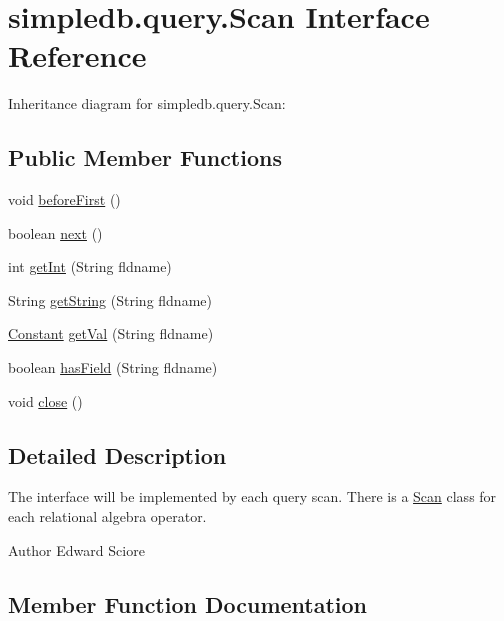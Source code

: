 \hypertarget{interfacesimpledb_1_1query_1_1Scan}{}\section{simpledb.\+query.\+Scan Interface Reference}
\label{interfacesimpledb_1_1query_1_1Scan}


Inheritance diagram for simpledb.\+query.\+Scan\+:
\subsection*{Public Member Functions}
\begin{DoxyCompactItemize}
\item 
void \hyperlink{interfacesimpledb_1_1query_1_1Scan_a2eceb634b69da9bf1269a4355808cc6b}{before\+First} ()
\item 
boolean \hyperlink{interfacesimpledb_1_1query_1_1Scan_a5fc77b7c76d91f89f6c09ac4f15ef351}{next} ()
\item 
int \hyperlink{interfacesimpledb_1_1query_1_1Scan_a2e064555e16240115167b5d42d2b3d19}{get\+Int} (String fldname)
\item 
String \hyperlink{interfacesimpledb_1_1query_1_1Scan_a922e219fee53ecfa6163525f9e3ef222}{get\+String} (String fldname)
\item 
\hyperlink{classsimpledb_1_1query_1_1Constant}{Constant} \hyperlink{interfacesimpledb_1_1query_1_1Scan_aca80bca2857c983a88834bf6c01ee5ca}{get\+Val} (String fldname)
\item 
boolean \hyperlink{interfacesimpledb_1_1query_1_1Scan_a8f4ccf13eed0bed983c928e9b998fe5c}{has\+Field} (String fldname)
\item 
void \hyperlink{interfacesimpledb_1_1query_1_1Scan_a260f40a8c82edaa00398bea9d698933c}{close} ()
\end{DoxyCompactItemize}


\subsection{Detailed Description}
The interface will be implemented by each query scan. There is a \hyperlink{interfacesimpledb_1_1query_1_1Scan}{Scan} class for each relational algebra operator. \begin{DoxyAuthor}{Author}
Edward Sciore 
\end{DoxyAuthor}


\subsection{Member Function Documentation}
\mbox{\label{interfacesimpledb_1_1query_1_1Scan_a2eceb634b69da9bf1269a4355808cc6b}} 
